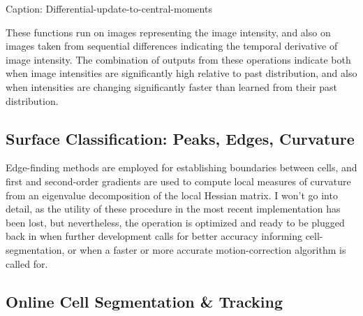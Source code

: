 \begin{Shaded}
\begin{Highlighting}[]
\NormalTok{-}\NormalTok{) + }
\NormalTok{) - }
\NormalTok{);}
\NormalTok{);}
\NormalTok{);}
\end{Highlighting}
\end{Shaded}

Caption: Differential-update-to-central-moments

These functions run on images representing the image intensity, and also
on images taken from sequential differences indicating the temporal
derivative of image intensity. The combination of outputs from these
operations indicate both when image intensities are significantly high
relative to past distribution, and also when intensities are changing
significantly faster than learned from their past distribution.

\subsection{Surface Classification: Peaks, Edges,
Curvature}\label{surface-classification-peaks-edges-curvature}

Edge-finding methods are employed for establishing boundaries between
cells, and first and second-order gradients are used to compute local
measures of curvature from an eigenvalue decomposition of the local
Hessian matrix. I won't go into detail, as the utility of these
procedure in the most recent implementation has been lost, but
nevertheless, the operation is optimized and ready to be plugged back in
when further development calls for better accuracy informing
cell-segmentation, or when a faster or more accurate motion-correction
algorithm is called for.

\subsection{Online Cell Segmentation \&
Tracking}\label{online-cell-segmentation-tracking}

